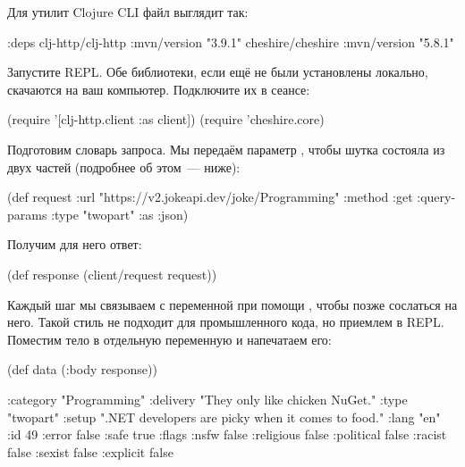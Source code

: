 Для утилит Clojure CLI файл  выглядит так:

\begin{english}
  \begin{clojure}
{:deps
 {clj-http/clj-http {:mvn/version "3.9.1"}
  cheshire/cheshire {:mvn/version "5.8.1"}}}
  \end{clojure}
\end{english}

Запустите REPL. Обе библиотеки, если ещё не были установлены локально, скачаются на ваш компьютер. Подключите их в сеансе:

\begin{english}
  \begin{clojure}
(require '[clj-http.client :as client])
(require 'cheshire.core)
  \end{clojure}
\end{english}

Подготовим словарь запроса. Мы передаём параметр , чтобы шутка состояла из двух частей (подробнее об этом~--- ниже):

\begin{english}
  \begin{clojure}
(def request
  {:url "https://v2.jokeapi.dev/joke/Programming"
   :method :get
   :query-params {:type "twopart"}
   :as :json})
  \end{clojure}
\end{english}

Получим для него ответ:

\begin{english}
  \begin{clojure}
(def response
  (client/request request))
  \end{clojure}
\end{english}

Каждый шаг мы связываем с переменной при помощи , чтобы позже сослаться на него. Такой стиль не подходит для промышленного кода, но приемлем в REPL. Поместим тело в отдельную переменную и напечатаем его:

\begin{english}
  \begin{clojure}
(def data
  (:body response))

{:category "Programming"
 :delivery "They only like chicken NuGet."
 :type "twopart"
 :setup ".NET developers are picky when it comes to food."
 :lang "en"
 :id 49
 :error false
 :safe true
 :flags
 {:nsfw false
  :religious false
  :political false
  :racist false
  :sexist false
  :explicit false}}
  \end{clojure}
\end{english}

